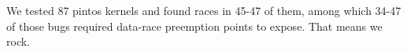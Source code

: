 \begin{enumerate}



\end{enumerate}


We tested 87 pintos kernels and found races in 45-47 of them, among which 34-47 of those bugs required data-race preemption points to expose. That means we rock.

